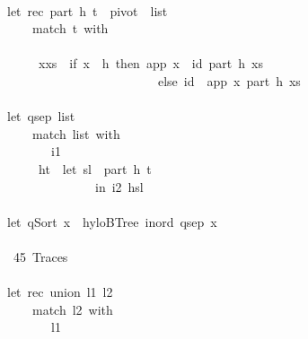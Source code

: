 \documentclass[a4paper]{article}
\begin{document}
\begin{tabbing}
\ttfamily ~\\
\ttfamily ~let~rec~part~h~t~~pivot~~list\\
\ttfamily ~~~~~match~t~with\\
\ttfamily ~~~~~~~~\\
\ttfamily ~~~~~~xxs~~if~x~~h~then~app~x~~id~part~h~xs\\
\ttfamily ~~~~~~~~~~~~~~~~~~~~~~~~~else~id~~app~x~part~h~xs\\
\ttfamily ~\\
\ttfamily ~let~qsep~list~\\
\ttfamily ~~~~~match~list~with\\
\ttfamily ~~~~~~~~i1~\\
\ttfamily ~~~~~~ht~~let~sl~~part~h~t\\
\ttfamily ~~~~~~~~~~~~~~~in~i2~hsl\\
\ttfamily ~\\
\ttfamily ~let~qSort~x~~hyloBTree~inord~qsep~x\\
\ttfamily ~\\
\ttfamily ~~45~Traces~\\
\ttfamily ~\\
\ttfamily ~let~rec~union~l1~l2~~\\
\ttfamily ~~~~~match~l2~with\\
\ttfamily ~~~~~~~~l1\\

\end{tabbing}
\end{document}
